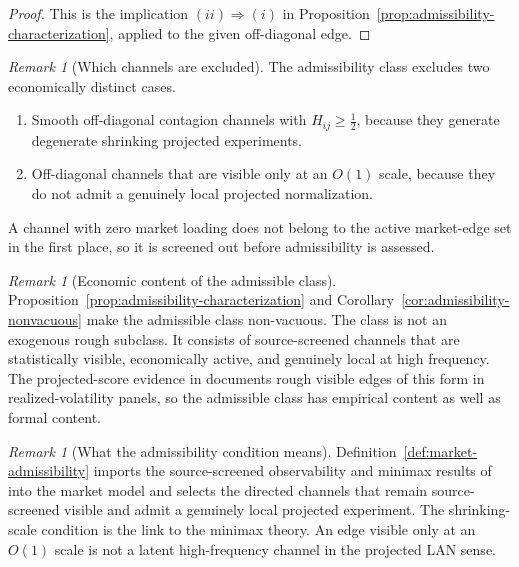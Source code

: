 \documentclass[11pt,a4paper]{amsart}
\theoremstyle{plain}
\theoremstyle{definition}
\theoremstyle{remark}
\newtheorem{remark}[theorem]{Remark}
\begin{document}
\begin{proof}
This is the implication \((ii)\Rightarrow(i)\) in
Proposition~\ref{prop:admissibility-characterization}, applied to the given off-diagonal edge.
\end{proof}

\begin{remark}[Which channels are excluded]\label{rem:excluded-admissibility}
The admissibility class excludes two economically distinct cases.
\begin{enumerate}[label=(\roman*)]
\item Smooth off-diagonal contagion channels with \(H_{ij}\ge\tfrac12\), because they generate
degenerate shrinking projected experiments.
\item Off-diagonal channels that are visible only at an \(O(1)\) scale, because they do not admit a genuinely
local projected normalization.
\end{enumerate}
A channel with zero market loading does not belong to the active market-edge set in the first
place, so it is screened out before admissibility is assessed.
\end{remark}

\begin{remark}[Economic content of the admissible class]
Proposition~\ref{prop:admissibility-characterization} and
Corollary~\ref{cor:admissibility-nonvacuous} make the admissible class non-vacuous.  The class is
not an exogenous rough subclass.  It consists of source-screened channels that are statistically
visible, economically active, and genuinely local at high frequency.  The projected-score evidence
in \cite{vidal2026econometric} documents rough visible edges of this form in realized-volatility
panels, so the admissible class has empirical content as well as formal content.
\end{remark}

\begin{remark}[What the admissibility condition means]
Definition~\ref{def:market-admissibility} imports the source-screened observability and minimax
results of \cite{vidal2026latent,vidal2026dynamic,vidal2026econometric} into the market model and
selects the directed channels that remain source-screened visible and admit a genuinely local
projected experiment.  The shrinking-scale condition is the link to the minimax theory.  An edge visible only
at an \(O(1)\) scale is not a latent high-frequency channel in the projected LAN sense.
\end{remark}
\end{document}
